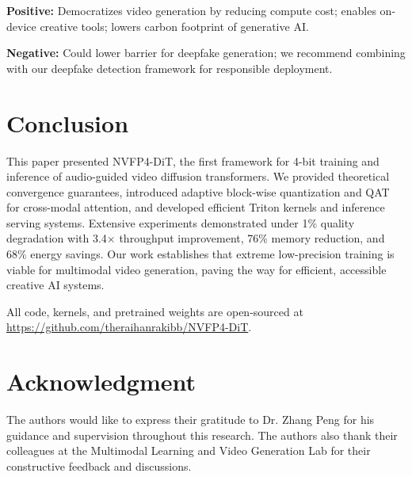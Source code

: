 \documentclass[journal]{IEEEtran}
\theoremstyle{definition}
\theoremstyle{remark}
\newcommand{\acknowledgment}{\section*{Acknowledgment}}
\begin{document}
\textbf{Positive:} Democratizes video generation by reducing compute cost; enables on-device creative tools; lowers carbon footprint of generative AI.

\textbf{Negative:} Could lower barrier for deepfake generation; we recommend combining with our deepfake detection framework \cite{raihan2026deepfake} for responsible deployment.

\section{Conclusion}
\label{sec:conclusion}

This paper presented NVFP4-DiT, the first framework for 4-bit training and inference of audio-guided video diffusion transformers. We provided theoretical convergence guarantees, introduced adaptive block-wise quantization and QAT for cross-modal attention, and developed efficient Triton kernels and inference serving systems. Extensive experiments demonstrated under 1\% quality degradation with 3.4$\times$ throughput improvement, 76\% memory reduction, and 68\% energy savings. Our work establishes that extreme low-precision training is viable for multimodal video generation, paving the way for efficient, accessible creative AI systems.

All code, kernels, and pretrained weights are open-sourced at \url{https://github.com/theraihanrakibb/NVFP4-DiT}.

\acknowledgment
The authors would like to express their gratitude to Dr. Zhang Peng for his guidance and supervision throughout this research. The authors also thank their colleagues at the Multimodal Learning and Video Generation Lab for their constructive feedback and discussions.
\end{document}
